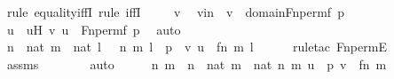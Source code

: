 \begin{isabellebody}
%
\isadelimproof
%
\endisadelimproof
%
\isatagproof
{}\isamarkupfalse%
\ {\isacharparenleft}{\kern0pt}rule\ equality{\isacharunderscore}{\kern0pt}iffI{\isacharcomma}{\kern0pt}\ rule\ iffI{\isacharparenright}{\kern0pt}\ \isanewline
\ \ \isamarkupfalse%
\ v\ \isamarkupfalse%
\ vin\ {\isacharcolon}{\kern0pt}\ {\isachardoublequoteopen}v\ {\isasymin}\ domain{\isacharparenleft}{\kern0pt}Fn{\isacharunderscore}{\kern0pt}perm{\isacharparenleft}{\kern0pt}f{\isacharcomma}{\kern0pt}\ p{\isacharparenright}{\kern0pt}{\isacharparenright}{\kern0pt}{\isachardoublequoteclose}\ \isanewline
\ \ \isamarkupfalse%
\ \isamarkupfalse%
\ u\ \ uH{\isacharcolon}{\kern0pt}\ {\isachardoublequoteopen}{\isacharless}{\kern0pt}v{\isacharcomma}{\kern0pt}\ u{\isachargreater}{\kern0pt}\ {\isasymin}\ Fn{\isacharunderscore}{\kern0pt}perm{\isacharparenleft}{\kern0pt}f{\isacharcomma}{\kern0pt}\ p{\isacharparenright}{\kern0pt}{\isachardoublequoteclose}\ \isamarkupfalse%
\ auto\isanewline
\ \ \isamarkupfalse%
\ \isamarkupfalse%
\ {\isachardoublequoteopen}{\isasymexists}n\ {\isasymin}\ nat{\isachardot}{\kern0pt}\ {\isasymexists}m\ {\isasymin}\ nat{\isachardot}{\kern0pt}\ {\isasymexists}l\ {\isasymin}\ {}{\isachardot}{\kern0pt}\ {\isacharless}{\kern0pt}{\isacharless}{\kern0pt}n{\isacharcomma}{\kern0pt}\ m{\isachargreater}{\kern0pt}{\isacharcomma}{\kern0pt}\ l{\isachargreater}{\kern0pt}\ {\isasymin}\ p\ {\isasymand}\ {\isacharless}{\kern0pt}v{\isacharcomma}{\kern0pt}\ u{\isachargreater}{\kern0pt}\ {\isacharequal}{\kern0pt}\ {\isacharless}{\kern0pt}{\isacharless}{\kern0pt}f{\isacharbackquote}{\kern0pt}n{\isacharcomma}{\kern0pt}\ m{\isachargreater}{\kern0pt}{\isacharcomma}{\kern0pt}\ l{\isachargreater}{\kern0pt}{\isachardoublequoteclose}\ \isanewline
\ \ \ \ \isamarkupfalse%
{\isacharparenleft}{\kern0pt}rule{\isacharunderscore}{\kern0pt}tac\ Fn{\isacharunderscore}{\kern0pt}permE{\isacharparenright}{\kern0pt}\isanewline
\ \ \ \ \isamarkupfalse%
\ assms\ \ \isanewline
\ \ \ \ \isamarkupfalse%
\ auto\isanewline
\ \ \isamarkupfalse%
\ \isamarkupfalse%
\ n\ m\ \ {\isachardoublequoteopen}n\ {\isasymin}\ nat{\isachardoublequoteclose}\ {\isachardoublequoteopen}m\ {\isasymin}\ nat{\isachardoublequoteclose}\ {\isachardoublequoteopen}{\isacharless}{\kern0pt}{\isacharless}{\kern0pt}n{\isacharcomma}{\kern0pt}\ m{\isachargreater}{\kern0pt}{\isacharcomma}{\kern0pt}\ u{\isachargreater}{\kern0pt}\ {\isasymin}\ p{\isachardoublequoteclose}\ {\isachardoublequoteopen}v\ {\isacharequal}{\kern0pt}\ {\isacharless}{\kern0pt}f{\isacharbackquote}{\kern0pt}n{\isacharcomma}{\kern0pt}\ m{\isachargreater}{\kern0pt}{\isachardoublequoteclose}\ \isamarkupfalse%

\end{isabellebody}
